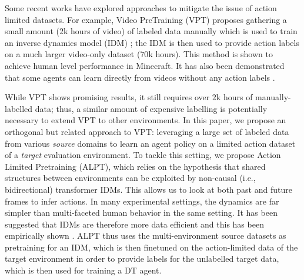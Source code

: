 \documentclass{article} %
\begin{document}
Some recent works have explored approaches to mitigate the issue of action limited datasets. For example, Video PreTraining (VPT) \citep{https://doi.org/10.48550/arxiv.2206.11795} proposes gathering a small amount ($2$k hours of video) of labeled data manually which is used to  train an inverse dynamics model (IDM) \citep{4936}; the  IDM is then used to provide action labels on a much larger video-only dataset ($70$k hours). %
This method is shown to achieve human level performance in Minecraft.  It has also been demonstrated that some agents can learn directly from videos without any action labels \citep{pmlr-v162-seo22a}.

While VPT shows promising results, it still requires over $2$k hours of manually-labelled data; thus, a similar amount of expensive labelling is potentially necessary to extend VPT to other environments. 
In this paper, we propose an orthogonal but related approach to  VPT: leveraging a large set of labeled data from various \emph{source} domains to learn an agent policy on a limited action dataset of a \emph{target} evaluation environment. %
To tackle this setting, we propose Action Limited Pretraining (ALPT), which relies on the hypothesis  that shared structures between environments can be exploited by non-causal (i.e., bidirectional) transformer IDMs. This allows us to look at both past and future frames to infer actions.  In many experimental settings, the dynamics are far simpler than multi-faceted human behavior in the same setting. It has been suggested that IDMs are therefore more data efficient and this has been empirically shown \citep{https://doi.org/10.48550/arxiv.2206.11795}.  ALPT thus uses the multi-environment source datasets as pretraining for an IDM, which is then finetuned on the action-limited data of the target environment in order to provide labels for the  unlabelled target data, which is then used for training a 
DT agent. 
\end{document}

